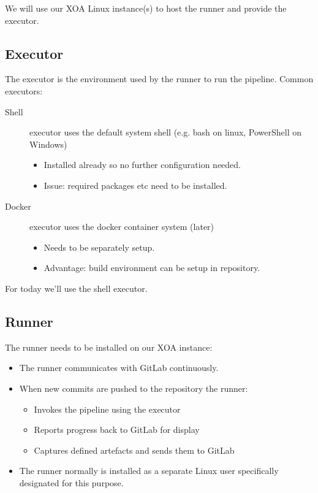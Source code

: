 \documentclass[slides]{pgnotes}
\begin{document}
We will use our XOA Linux instance(s) to host the runner and provide the executor.


\subsection{Executor}

The executor is the environment used by the runner to run the pipeline.
Common executors:
\begin{description}
\item[Shell] executor uses the default system shell (e.g. bash on linux, PowerShell on Windows)
  \begin{itemize}
  \item Installed already so no further configuration needed.
  \item Issue: required packages etc need to be installed.
  \end{itemize}
\item[Docker] executor uses the docker container system (later)
  \begin{itemize}
  \item Needs to be separately setup.
  \item Advantage: build environment can be setup in repository.
  \end{itemize}
\end{description}
For today we'll use the shell executor.


\subsection{Runner}

The runner needs to be installed on our XOA instance:
\begin{itemize}
\item The runner communicates with GitLab continuously.
\item When new commits are pushed to the repository the runner:
  \begin{itemize}
  \item Invokes the pipeline using the executor
  \item Reports progress back to GitLab for display
  \item Captures defined artefacts and sends them to GitLab
  \end{itemize}
\item The runner normally is installed as a separate Linux user specifically designated for this purpose.
\end{itemize}
  
\end{document}
